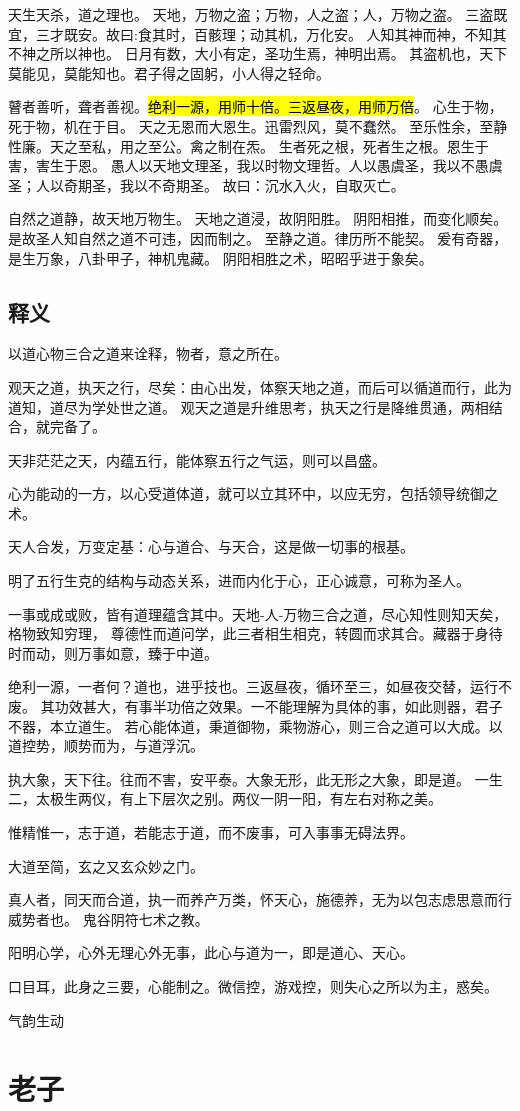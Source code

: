 天生天杀，道之理也。
天地，万物之盗；万物，人之盗；人，万物之盗。
三盗既宜，三才既安。故曰:食其时，百骸理；动其机，万化安。
人知其神而神，不知其不神之所以神也。
日月有数，大小有定，圣功生焉，神明出焉。
其盗机也，天下莫能见，莫能知也。君子得之固躬，小人得之轻命。 

瞽者善听，聋者善视。\hl{绝利一源，用师十倍。三返昼夜，用师万倍}。
心生于物，死于物，机在于目。
天之无恩而大恩生。迅雷烈风，莫不蠢然。
至乐性余，至静性廉。天之至私，用之至公。禽之制在炁。
生者死之根，死者生之根。恩生于害，害生于恩。
愚人以天地文理圣，我以时物文理哲。人以愚虞圣，我以不愚虞圣；人以奇期圣，我以不奇期圣。
故曰：沉水入火，自取灭亡。

自然之道静，故天地万物生。
天地之道浸，故阴阳胜。
阴阳相推，而变化顺矣。是故圣人知自然之道不可违，因而制之。
至静之道。律历所不能契。
爰有奇器，是生万象，八卦甲子，神机鬼藏。
阴阳相胜之术，昭昭乎进于象矣。 

\subsection{释义}

以道心物三合之道来诠释，物者，意之所在。

观天之道，执天之行，尽矣：由心出发，体察天地之道，而后可以循道而行，此为道知，道尽为学处世之道。
观天之道是升维思考，执天之行是降维贯通，两相结合，就完备了。

天非茫茫之天，内蕴五行，能体察五行之气运，则可以昌盛。

心为能动的一方，以心受道体道，就可以立其环中，以应无穷，包括领导统御之术。

天人合发，万变定基：心与道合、与天合，这是做一切事的根基。

明了五行生克的结构与动态关系，进而内化于心，正心诚意，可称为圣人。

一事或成或败，皆有道理蕴含其中。天地-人-万物三合之道，尽心知性则知天矣，格物致知穷理，
尊德性而道问学，此三者相生相克，转圆而求其合。藏器于身待时而动，则万事如意，臻于中道。

绝利一源，一者何？道也，进乎技也。三返昼夜，循环至三，如昼夜交替，运行不废。
其功效甚大，有事半功倍之效果。一不能理解为具体的事，如此则器，君子不器，本立道生。
若心能体道，秉道御物，乘物游心，则三合之道可以大成。以道控势，顺势而为，与道浮沉。

执大象，天下往。往而不害，安平泰。大象无形，此无形之大象，即是道。
一生二，太极生两仪，有上下层次之别。两仪一阴一阳，有左右对称之美。

惟精惟一，志于道，若能志于道，而不废事，可入事事无碍法界。

大道至简，玄之又玄众妙之门。

真人者，同天而合道，执一而养产万类，怀天心，施德养，无为以包志虑思意而行威势者也。
鬼谷阴符七术之教。

阳明心学，心外无理心外无事，此心与道为一，即是道心、天心。

口目耳，此身之三要，心能制之。微信控，游戏控，则失心之所以为主，惑矣。

气韵生动

\section{老子}
